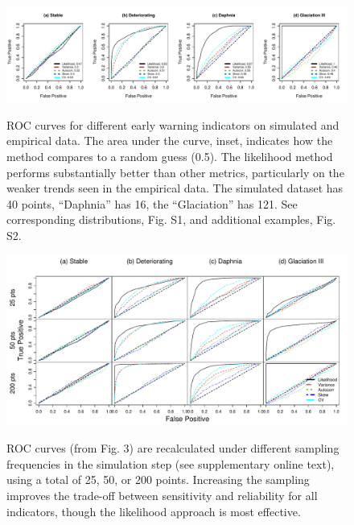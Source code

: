\documentclass{pnastwo}
\begin{document}
 \begin{figure}
   \begin{center}
     \includegraphics[width=\linewidth]{Fig3}
     \label{fig3}
     \caption{ROC curves for different early warning indicators on simulated and empirical data.  The area under the curve, inset, indicates how the method compares to a random guess (0.5).  The likelihood method performs substantially better than other metrics, particularly on the weaker trends seen in the empirical data. The simulated dataset has 40 points, ``Daphnia'' has 16, the ``Glaciation'' has 121. See corresponding distributions, Fig. S1, and additional examples, Fig. S2.}
  \end{center}
 \end{figure}


 \begin{figure}
   \begin{center}
     \includegraphics[width=\linewidth]{Fig4}
     \label{fig4}
     \caption{ROC curves (from Fig. 3) are recalculated under different sampling frequencies in the simulation step (see supplementary online text), using a total of 25, 50, or 200 points.  Increasing the sampling improves the trade-off between sensitivity and reliability for all indicators, though the likelihood approach is most effective.} 
  \end{center}
 \end{figure}



\end{document}
